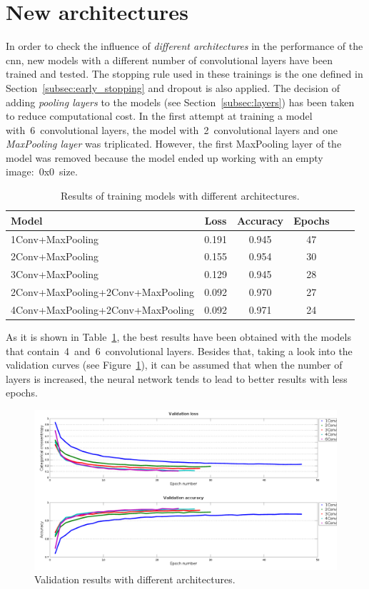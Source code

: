 \section{New architectures}\label{subsec:arch}
In order to check the influence of \emph{different architectures} in the performance of the \gls{cnn}, new models with a different number of convolutional layers have been trained and tested. The stopping rule used in these trainings is the one defined in Section~\ref{subsec:early_stopping} and dropout is also applied. The decision of adding \emph{pooling layers} to the models (see Section~\ref{subsec:layers}) has been taken to reduce computational cost. In the first attempt at training a model with~6~convolutional layers, the model with~2~convolutional layers and one \emph{MaxPooling layer} was triplicated. However, the first MaxPooling layer of the model was removed because the model ended up working with an empty image:~0x0~size.
\begin{table}
	\centering
	\begin{tabular}{l*{4}{c}r}
		\textbf{Model} & \textbf{Loss} & \textbf{Accuracy} & \textbf{Epochs} \\
		\hline
		1Conv+MaxPooling & 0.191 & 0.945 & 47 \\
		2Conv+MaxPooling & 0.155 & 0.954 & 30 \\
		3Conv+MaxPooling & 0.129 & 0.945 & 28 \\
		2Conv+MaxPooling+2Conv+MaxPooling & 0.092 & 0.970 & 27 \\
		4Conv+MaxPooling+2Conv+MaxPooling & 0.092 & 0.971 & 24 \\
	\end{tabular}
	\caption{Results of training models with different architectures.}
	\label{tbl:arch}
\end{table}

As it is shown in Table~\ref{tbl:arch}, the best results have been obtained with the models that contain~4~and~6~convolutional layers. Besides that, taking a look into the validation curves (see Figure~\ref{fig:comp_arch}), it can be assumed that when the number of layers is increased, the neural network tends to lead to better results with less epochs.

\begin{figure}
	\centering
	\includegraphics[width=1\linewidth, keepaspectratio]{figures/full_comparison.png}
	\caption{Validation results with different architectures.}
	\label{fig:comp_arch}
\end{figure}

